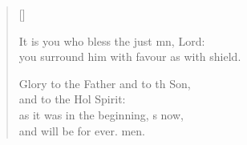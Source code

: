\begin{verse}[\versewidth]
\begin{patverse}
It is you who bless the just mn, Lord:\Med\\
    you surround him with favour as with  shield.

Glory to the Father and to th Son,\Med\\
    and to the Hol Spirit:\\
as it was in the beginning, \pointup{\i}s now,\Med\\
    and will be for ever. men.
  \end{patverse}
\end{verse}
